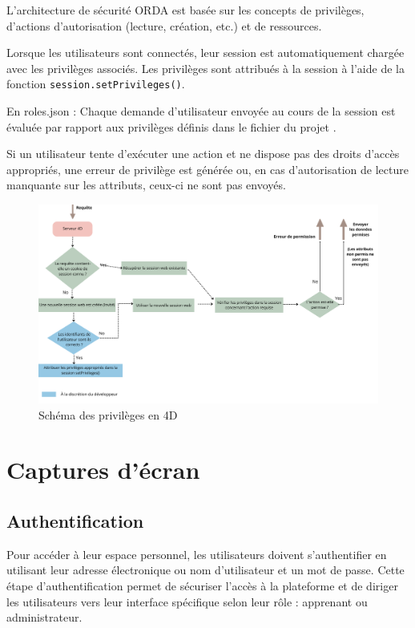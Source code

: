 L'architecture de sécurité ORDA est basée sur les concepts de privilèges, d'actions d'autorisation (lecture, création, etc.) et de ressources.

Lorsque les utilisateurs sont connectés, leur session est automatiquement chargée avec les privilèges associés. Les privilèges sont attribués à la session à l’aide de la fonction \texttt{session.setPrivileges()}.

En roles.json : Chaque demande d'utilisateur envoyée au cours de la session est évaluée par rapport aux privilèges définis dans le fichier du projet .

Si un utilisateur tente d'exécuter une action et ne dispose pas des droits d'accès appropriés, une erreur de privilège est générée ou, en cas d'autorisation de lecture manquante sur les attributs, ceux-ci ne sont pas envoyés.


\begin{figure}[H]
    \centering
    \includegraphics[width=19cm]{Figures/privilege.png}
    \caption{Schéma des privilèges en 4D}
\end{figure}

\section{Captures d'écran}


\subsection{Authentification}

Pour accéder à leur espace personnel, les utilisateurs doivent s'authentifier en utilisant leur adresse électronique ou nom d'utilisateur et un mot de passe. Cette étape d'authentification permet de sécuriser l'accès à la plateforme et de diriger les utilisateurs vers leur interface spécifique selon leur rôle : apprenant ou administrateur.


